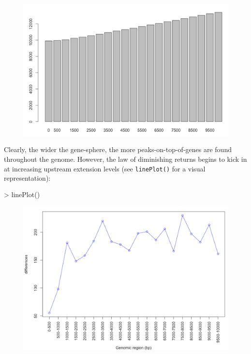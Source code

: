 \documentclass[12pt]{article}
\begin{document}
\begin{figure}[H]
\centering
\includegraphics{figures/fig1.png}
\end{figure}

Clearly, the wider the gene-sphere, the more peaks-on-top-of-genes are found throughout the genome.  However, the law of diminishing returns begins to kick in at increasing upstream extension levels (see \texttt{linePlot()} for a visual representation):

\begin{Schunk}
\begin{Sinput}
> linePlot()
\end{Sinput}
\end{Schunk}

\begin{figure}[H]
\centering
\includegraphics{figures/fig2.png}
\end{figure}
\end{document}
